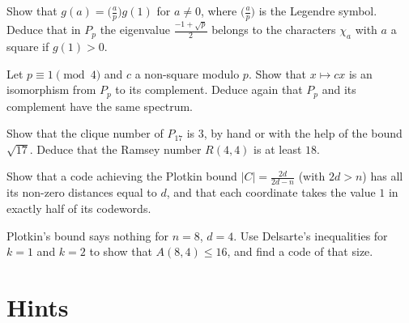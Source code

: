 \begin{exercise}[$\star\star$]\label{ex:gausssign}
Show that $g(a)=\bigl(\frac ap\bigr)g(1)$ for $a\ne0$, where $\bigl(\frac ap\bigr)$ is the Legendre symbol. Deduce that in $P_p$ the
eigenvalue $\frac{-1+\sqrt p}2$ belongs to the characters $\chi_a$ with $a$ a square if $g(1)>0$.
\end{exercise}

\begin{exercise}[$\star$]\label{ex:paleyself}
Let $p\equiv1\pmod4$ and $c$ a non-square modulo $p$. Show that $x\mapsto cx$ is an isomorphism from $P_p$ to its complement.
Deduce again that $P_p$ and its complement have the same spectrum.
\end{exercise}

\begin{exercise}[$\star\star$]\label{ex:paleyramsey}
Show that the clique number of $P_{17}$ is $3$, by hand or with the help of the bound $\sqrt{17}$. Deduce that the Ramsey number
$R(4,4)$ is at least $18$.
\end{exercise}

\begin{exercise}[$\star\star$]\label{ex:plotkinsharp}
Show that a code achieving the Plotkin bound $|C|=\frac{2d}{2d-n}$ (with $2d>n$) has all its non-zero distances equal to $d$, and
that each coordinate takes the value $1$ in exactly half of its codewords.
\end{exercise}

\begin{exercise}[$\star\star\star$]\label{ex:lpthree}
Plotkin's bound says nothing for $n=8$, $d=4$. Use Delsarte's inequalities for $k=1$ and $k=2$ to show that $A(8,4)\le16$, and find
a code of that size.
\end{exercise}

\section{Hints}

